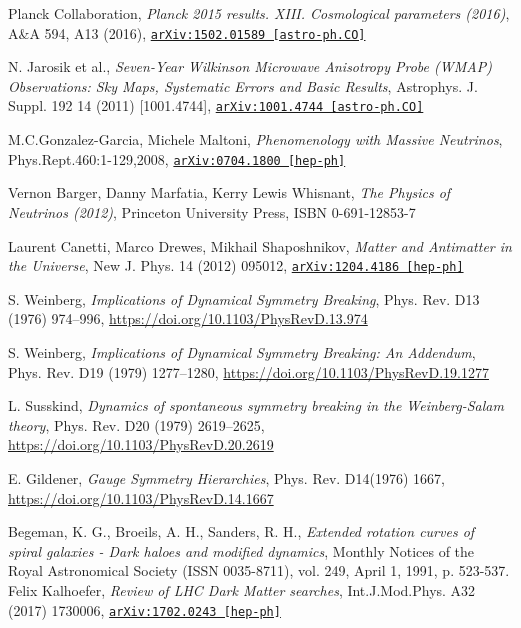 \documentclass[11pt,a4paper,openright,twoside]{report}
\newcommand{\bibref}[4]{#1, \textit{#2}, #3 #4}
\begin{document}
\begin{thebibliography}{9}
	\bibref{Planck Collaboration}{Planck 2015 results. XIII. Cosmological parameters (2016)}{A\&A 594, A13 (2016),}{\href{https://arxiv.org/abs/1502.01589}{\texttt{arXiv:1502.01589 [astro-ph.CO]}}}

	\bibref{N. Jarosik et al.}{Seven-Year Wilkinson Microwave Anisotropy Probe (WMAP) Observations: Sky Maps, Systematic Errors and Basic Results}{Astrophys. J. Suppl. 192 14 (2011) [1001.4744],}{\href{https://arxiv.org/abs/1001.4744}{\texttt{arXiv:1001.4744 [astro-ph.CO]}}}

	\bibref{M.C.Gonzalez-Garcia, Michele Maltoni}{Phenomenology with Massive Neutrinos}{Phys.Rept.460:1-129,2008,}{\href{https://arxiv.org/abs/0704.1800}{\texttt{arXiv:0704.1800 [hep-ph]}}}

	\bibref{Vernon Barger, Danny Marfatia, Kerry Lewis Whisnant}{The Physics of Neutrinos (2012)}{Princeton University Press,}{ISBN 0-691-12853-7}

	\bibref{Laurent Canetti, Marco Drewes, Mikhail Shaposhnikov}{Matter and Antimatter in the Universe}{New J. Phys. 14 (2012) 095012,}{\href{https://arxiv.org/abs/1204.4186}{\texttt{arXiv:1204.4186 [hep-ph]}}}

	\bibref{S. Weinberg}{Implications of Dynamical Symmetry Breaking}{Phys. Rev. D13 (1976) 974–996,}{\url{https://doi.org/10.1103/PhysRevD.13.974}}

	\bibref{S. Weinberg}{Implications of Dynamical Symmetry Breaking:  An Addendum}{Phys. Rev. D19 (1979) 1277–1280,}{\url{https://doi.org/10.1103/PhysRevD.19.1277}}

	\bibref{L. Susskind}{Dynamics of spontaneous symmetry breaking in the Weinberg-Salam theory}{Phys. Rev. D20 (1979) 2619–2625,}{\url{https://doi.org/10.1103/PhysRevD.20.2619}}

	\bibref{E. Gildener}{Gauge Symmetry Hierarchies}{Phys. Rev. D14(1976) 1667,}{\url{https://doi.org/10.1103/PhysRevD.14.1667}}

	\bibref{Begeman, K. G., Broeils, A. H., Sanders, R. H.}{Extended rotation curves of spiral galaxies - Dark haloes and modified dynamics}{Monthly Notices of the Royal Astronomical Society (ISSN 0035-8711), vol. 249, April 1, 1991, p. 523-537.}
	
	\bibref{Felix Kalhoefer}{Review of LHC Dark Matter searches}{Int.J.Mod.Phys. A32 (2017) 1730006,}{\href{https://arxiv.org/abs/1702.02430}{\texttt{arXiv:1702.0243 [hep-ph]}}}


\end{thebibliography}
\end{document}
